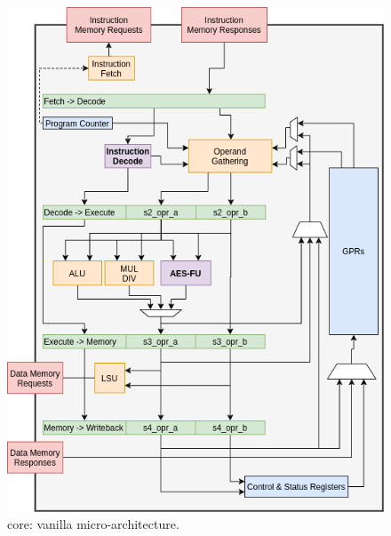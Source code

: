 
\vspace*{\fill}

\begin{figure}[!h]
\centering
\includegraphics[scale={0.45},angle={90}]{diagrams/scarv-cpu-uarch.png}
\caption{
   core: vanilla  micro-architecture.
}
\label{fig:core:2:normal}
\end{figure}


\vspace*{\fill}


